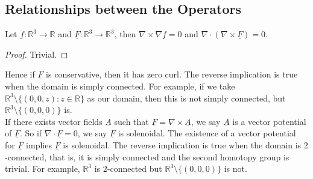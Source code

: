 \subsection{Relationships between the Operators}
\begin{proposition}
    Let $f:\mathbb R^3\to\mathbb R$ and $\underline{F}:\mathbb R^3\to\mathbb R^3$, then $\nabla\times\nabla f=0$ and $\nabla \cdot(\nabla\times\underline{F})=0$.
\end{proposition}
\begin{proof}
    Trivial.
\end{proof}
Hence if $\underline{F}$ is conservative, then it has zero curl.
The reverse implication is true when the domain is simply connected.
For example, if we take $\mathbb R^3\setminus\{(0,0,z):z\in\mathbb R\}$ as our domain, then this is not simply connected, but $\mathbb R^3\setminus\{(0,0,0)\}$ is.\\
If there exists vector fields $\underline{A}$ such that $\underline{F}=\nabla\times\underline{A}$, we say $\underline{A}$ is a vector potential of $\underline{F}$.
So if $\nabla\cdot\underline{F}=0$, we say $\underline{F}$ is solenoidal.
The existence of a vector potential for $\underline{F}$ implies $\underline{F}$ is solenoidal.
The reverse implication is true when the domain is $2$-connected, that is, it is simply connected and the second homotopy group is trivial.
For example, $\mathbb R^3$ is $2$-connected but $\mathbb R^3\setminus\{(0,0,0)\}$ is not.
